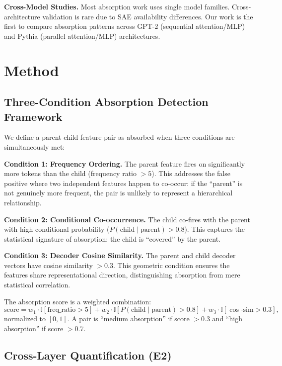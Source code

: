 \documentclass{article}
\begin{document}
\textbf{Cross-Model Studies.} Most absorption work uses single model families. Cross-architecture validation is rare due to SAE availability differences. Our work is the first to compare absorption patterns across GPT-2 (sequential attention/MLP) and Pythia (parallel attention/MLP) architectures.

\section{Method}
\label{sec:method}

\subsection{Three-Condition Absorption Detection Framework}
\label{subsec:framework}

We define a parent-child feature pair as absorbed when three conditions are simultaneously met:

\textbf{Condition 1: Frequency Ordering.} The parent feature fires on significantly more tokens than the child (frequency ratio $> 5$). This addresses the false positive where two independent features happen to co-occur: if the ``parent'' is not genuinely more frequent, the pair is unlikely to represent a hierarchical relationship.

\textbf{Condition 2: Conditional Co-occurrence.} The child co-fires with the parent with high conditional probability ($P(\text{child} \mid \text{parent}) > 0.8$). This captures the statistical signature of absorption: the child is ``covered'' by the parent.

\textbf{Condition 3: Decoder Cosine Similarity.} The parent and child decoder vectors have cosine similarity $> 0.3$. This geometric condition ensures the features share representational direction, distinguishing absorption from mere statistical correlation.

The absorption score is a weighted combination:
\begin{equation}
    \text{score} = w_1 \cdot \mathbb{I}[\text{freq\_ratio} > 5] + w_2 \cdot \mathbb{I}[P(\text{child} \mid \text{parent}) > 0.8] + w_3 \cdot \mathbb{I}[\cos\text{-sim} > 0.3],
\end{equation}
normalized to $[0, 1]$. A pair is ``medium absorption'' if score $> 0.3$ and ``high absorption'' if score $> 0.7$.

\subsection{Cross-Layer Quantification (E2)}
\label{subsec:e2}
\end{document}
